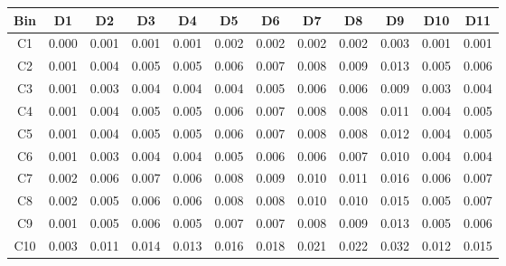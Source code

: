 \begin{tabular}{c@{~~~}c@{~~}c@{~~}c@{~~}c@{~~}c@{~~}c@{~~}c@{~~}c@{~~}c@{~~}c@{~~}c}
\hline 
 \hline 
Bin	& D1 & D2 & D3 & D4 & D5 & D6 & D7 & D8 & D9 & D10 & D11 \\ 
\hline 
C1	&  0.000 &  0.001 &  0.001 &  0.001 &  0.002 &  0.002 &  0.002 &  0.002 &  0.003 &  0.001 &  0.001 \\  
C2	&  0.001 &  0.004 &  0.005 &  0.005 &  0.006 &  0.007 &  0.008 &  0.009 &  0.013 &  0.005 &  0.006 \\  
C3	&  0.001 &  0.003 &  0.004 &  0.004 &  0.004 &  0.005 &  0.006 &  0.006 &  0.009 &  0.003 &  0.004 \\  
C4	&  0.001 &  0.004 &  0.005 &  0.005 &  0.006 &  0.007 &  0.008 &  0.008 &  0.011 &  0.004 &  0.005 \\  
C5	&  0.001 &  0.004 &  0.005 &  0.005 &  0.006 &  0.007 &  0.008 &  0.008 &  0.012 &  0.004 &  0.005 \\  
C6	&  0.001 &  0.003 &  0.004 &  0.004 &  0.005 &  0.006 &  0.006 &  0.007 &  0.010 &  0.004 &  0.004 \\  
C7	&  0.002 &  0.006 &  0.007 &  0.006 &  0.008 &  0.009 &  0.010 &  0.011 &  0.016 &  0.006 &  0.007 \\  
C8	&  0.002 &  0.005 &  0.006 &  0.006 &  0.008 &  0.008 &  0.010 &  0.010 &  0.015 &  0.005 &  0.007 \\  
C9	&  0.001 &  0.005 &  0.006 &  0.005 &  0.007 &  0.007 &  0.008 &  0.009 &  0.013 &  0.005 &  0.006 \\  
C10	&  0.003 &  0.011 &  0.014 &  0.013 &  0.016 &  0.018 &  0.021 &  0.022 &  0.032 &  0.012 &  0.015 \\  
\hline 
 \hline 
\end{tabular}